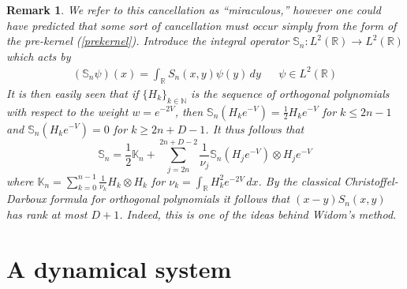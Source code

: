 \documentclass[12pt]{article}
\newtheorem{remark}[theorem]{Remark}
\theoremstyle{definition}
\begin{document}
\begin{remark}
We refer to this cancellation as \enquote{miraculous,} however one could have predicted that some sort of cancellation must occur simply from the form of the pre-kernel (\ref{prekernel}).  Introduce the integral operator $\mathbb{S}_n :L^2(\mathbb{R}) \to L^2(\mathbb{R})$ which acts by
\begin{align*}
(\mathbb{S}_n \psi)(x) = \int_\mathbb{R} S_n(x,y) \psi(y) \, dy & & \psi \in L^2(\mathbb{R})
\end{align*}
It is then easily seen that if $\{ H_k \}_{k \in \mathbb{N}}$ is the sequence of \textit{orthogonal} polynomials with respect to the weight $w = e^{-2V}$, then $\mathbb{S}_n ( H_k e^{-V}) = \frac{1}{2} H_k e^{-V}$ for $k \leq 2n-1$ and $\mathbb{S}_n ( H_k e^{-V}) = 0$ for $k \geq 2n+D-1$. It thus follows that 
$$\mathbb{S}_n  = \frac{1}{2} \mathbb{K}_n + \sum_{j=2n}^{2n+D-2} \frac{1}{\nu_j} \mathbb{S}_n(H_j e^{-V}) \otimes H_j e^{-V} $$
where $\mathbb{K}_n = \sum_{k=0}^{n-1} \frac{1}{\nu_k} H_k \otimes H_k$ for $\nu_k = \int_\mathbb{R} H_k^2 e^{-2V}\, dx$. By the classical Christoffel-Darboux formula for orthogonal polynomials it follows that $(x-y) S_n(x,y)$ has rank at most $D+1$.  Indeed, this is one of the ideas behind Widom's method.
\end{remark}

\section{A dynamical system}\label{dynamicsection}
\end{document}
